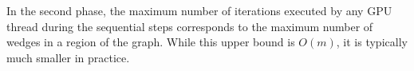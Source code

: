 \documentclass[conference]{IEEEtran}
\begin{document}
        








In the second phase, the maximum number of iterations executed by any GPU thread during the sequential steps corresponds to the maximum number of wedges in a region of the graph. While this upper bound is \(O(m)\), it is typically much smaller in practice.
\end{document}
